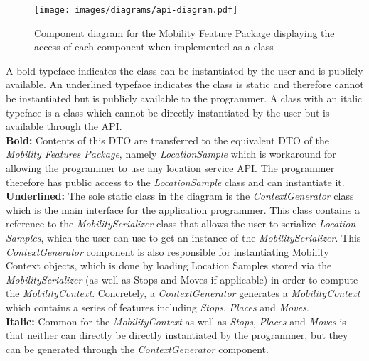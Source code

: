  \begin{figure}[h]
    \centering
    \texttt{[image: images/diagrams/api-diagram.pdf]}
    \caption{Component diagram for the Mobility Feature Package displaying the access of each component when implemented as a class}
    \label{fig:component-diagram}
\end{figure}
 
A bold typeface indicates the class can be instantiated by the user and is publicly available. An underlined typeface indicates the class is static and therefore cannot be instantiated but is publicly available to the programmer. A class with an italic typeface is a class which cannot be directly instantiated by the user but is available through the API. \\
 
\textbf{Bold:} Contents of this DTO are transferred to the equivalent DTO of the \textit{Mobility Features Package}, namely \textit{LocationSample} which is workaround for allowing the programmer to use any location service API. The programmer therefore has public access to the \textit{LocationSample} class and can instantiate it.\\

\textbf{Underlined:} The sole static class in the diagram is the \textit{ContextGenerator} class which is the main interface for the application programmer. This class contains a reference to the \textit{MobilitySerializer} class that allows the user to serialize \textit{Location Samples}, which the user can use to get an instance of the \textit{MobilitySerializer}. This \textit{ContextGenerator} component is also responsible for instantiating  Mobility Context objects, which is done by loading Location Samples stored via the \textit{MobilitySerializer} (as well as Stops and Moves if applicable) in order to compute the \textit{MobilityContext}. Concretely, a \textit{ContextGenerator} generates a \textit{MobilityContext} which contains a series of features including \textit{Stops}, \textit{Places} and \textit{Moves}.\\

\textbf{Italic:} Common for the \textit{MobilityContext} as well as \textit{Stops}, \textit{Places} and \textit{Moves} is that neither can directly be directly instantiated by the programmer, but they can be generated through the \textit{ContextGenerator} component. \\



